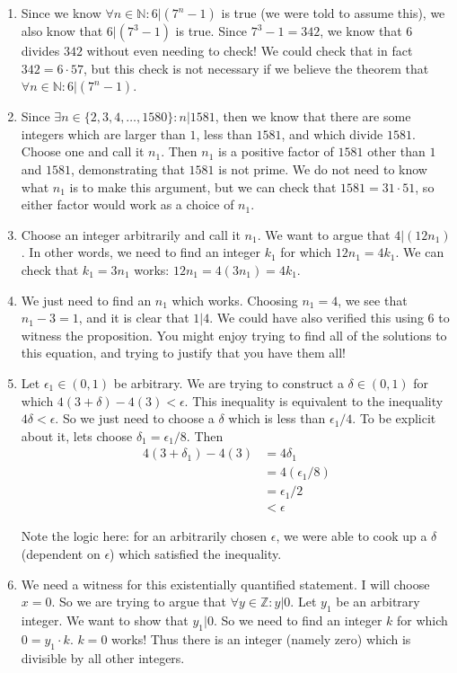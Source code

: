 \begin{solutions}	
	\begin{enumerate}
		\item Since we know $\forall n \in \mathbb{N}: 6 | (7^n-1)$ is true (we were told to assume this), we also know that $6|(7^3-1)$ is true. Since $7^3-1 = 342$, we know that $6$ divides $342$ without even needing to check!  We could check that in fact $342 = 6 \cdot 57$, but this check is not necessary if we believe the theorem that$\forall n \in \mathbb{N}: 6 | (7^n-1)$. 
		
		\item Since $\exists n  \in \{2,3,4, \dots, 1580 \}: n |  1581$, then we know that there are some integers which are larger than $1$, less than $1581$, and which divide $1581$.  Choose one and call it $n_1$.  Then $n_1$ is a positive factor of $1581$ other than $1$ and $1581$, demonstrating that $1581$ is not prime.  We do not need to know what $n_1$ is to make this argument, but we can check that $1581 = 31 \cdot 51$, so either factor would work as a choice of $n_1$.
		
		\item Choose an integer arbitrarily and call it $n_1$.  We want to argue that $4|(12n_1)$.  In other words, we need to find an integer $k_1$ for which $12n_1 = 4k_1$.  We can check that $k_1 = 3n_1$ works:  $12n_1 = 4(3n_1) = 4k_1$.

		\item We just need to find an $n_1$ which works.  Choosing $n_1 = 4$, we see that $n_1 - 3 = 1$, and it is clear that $1 | 4$.  We could have also verified this using $6$  to witness the proposition.  You might enjoy trying to find all of the solutions to this equation, and trying to justify that you have them all!
		\item Let $\epsilon_1 \in (0,1)$ be arbitrary.  We are trying to construct a $\delta \in (0,1)$ for which $4(3+\delta)-4(3) < \epsilon$.  This inequality is equivalent to the inequality $4\delta < \epsilon$.  So we just need to choose a $\delta$ which is less than $\epsilon_1/4$.  To be explicit about it, lets choose $\delta_1 = \epsilon_1/8$.  Then 
		\begin{align*}
			4(3+\delta_1)-4(3) &= 4\delta_1 \\
			&= 4(\epsilon_1/8)\\
			&=\epsilon_1/2\\
			&<\epsilon
		\end{align*}
		
		Note the logic here:  for an arbitrarily chosen $\epsilon$, we were able to cook up a $\delta$ (dependent on $\epsilon$) which satisfied the inequality.
		\item We need a witness for this existentially quantified statement.  I will choose $x=0$.  So we are trying to argue that $\forall y \in \mathbb{Z}:  y|0$.  Let $y_1$ be an arbitrary integer.  We want to show that $y_1 | 0$.  So we need to find an integer $k$ for which $0 = y_1 \cdot k$.  $k=0$ works!  Thus there is an integer (namely zero) which is divisible by all other integers.
	\end{enumerate}
\end{solutions}




